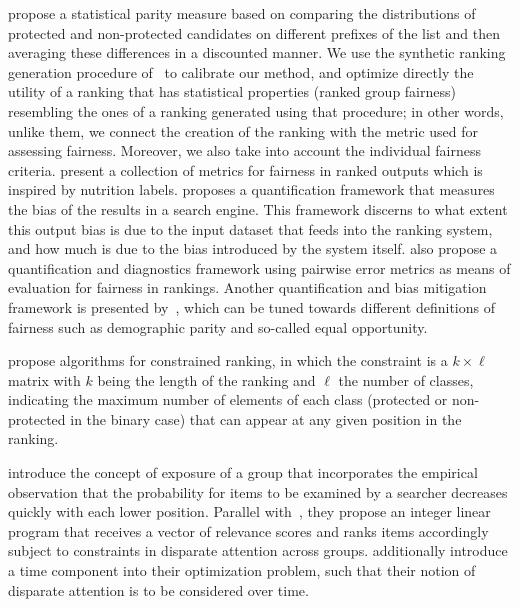 \citet{yang2016measuring} propose a statistical parity measure based on comparing the distributions of protected and non-protected candidates on different prefixes of the list and then averaging these differences in a discounted manner.
%
%
%
We use the synthetic ranking generation procedure of~\citet{yang2016measuring} to calibrate our method, and optimize directly the utility of a ranking that has statistical properties (ranked group fairness) resembling the ones of a ranking generated using that procedure; in other words, unlike them, we connect the creation of the ranking with the metric used for assessing fairness.
Moreover, we also take into account the individual fairness criteria.
%
\citet{yang2018nutritional} present a collection of metrics for fairness in ranked outputs which is inspired by nutrition labels.
%
\citet{kulshrestha_2017_quantifying} proposes a quantification framework that measures the bias of the results in a search engine.
This framework discerns to what extent this output bias is due to the input dataset that feeds into the ranking system, and how much is due to the bias introduced by the system itself.
%
\citet{kuhlman2019fare} also propose a quantification and diagnostics framework using pairwise error metrics as means of evaluation for fairness in rankings.
%
Another quantification and bias mitigation framework is presented by~\citet{geyik2019fairness}, which can be tuned towards different definitions of fairness such as demographic parity and so-called equal opportunity.

\citet{celis2017ranking} propose algorithms for constrained ranking, in which the constraint is a $k \times \ell$ matrix with $k$ being the length of the ranking and $\ell$ the number of classes, indicating the maximum number of elements of each class (protected or non-protected in the binary case) that can appear at any given position in the ranking.

\citet{singh2018fairness} introduce the concept of exposure of a group that incorporates the empirical observation that the probability for items to be examined by a searcher decreases quickly with each lower position.
%
Parallel with~\citet{biega2018equity}, they propose an integer linear program that receives a vector of relevance scores and ranks items accordingly subject to constraints in disparate attention across groups. \citet{biega2018equity} additionally introduce a time component into their optimization problem, such that their notion of disparate attention is to be considered over time.

